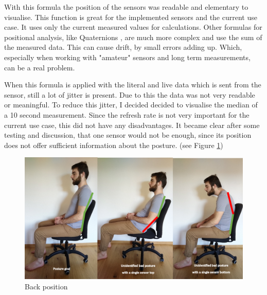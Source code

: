 With this formula the position of the sensors was readable and elementary to visualise. This function is great for the implemented sensors and the current use case. It uses only the current measured values for calculations. Other formulas for positional analysis, like Quaternions \cite{MathsQua11}, are much more complex and use the sum of the measured data. This can cause drift, by small errors adding up. Which, especially when working with "amateur" sensors and long term measurements, can be a real problem.

When this formula is applied with the literal and live data which is sent from the sensor, still a lot of jitter is present. Due to this the data was not very readable or meaningful. To reduce this jitter, I decided decided to visualise the median of a 10 second measurement. Since the refresh rate is not very important for the current use case, this did not have any disadvantages. It became clear after some testing and discussion, that one sensor would not be enough, since its position does not offer sufficient information about the posture. (see Figure \ref{fig:BackPos})

\begin{figure}[h]
  \begin{center}
\includegraphics[width=\textwidth]{images/Backposition.png}
  \end{center}
  \caption{Back position}
  \label{fig:BackPos}
\end{figure}

